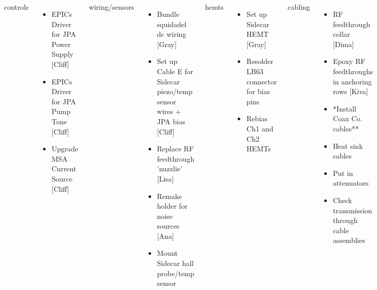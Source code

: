 \documentclass{beamer}
\begin{document}
\begin{frame}
\begin{columns}
{\color{blue} controls}
\begin{itemize}
\item[] {\tiny EPICs Driver for JPA Power Supply  [Cliff]}
\item[] {\tiny EPICs Driver for JPA Pump Tone  [Cliff]}
\item[] {\tiny Upgrade MSA Current Source [Cliff]}
\end{itemize}

{\color{blue} wiring/sensors}
\begin{itemize}
\item[] {\tiny Bundle squidadel dc wiring [Gray]}
\item[] {\tiny Set up Cable E for Sidecar piezo/temp sensor wires + JPA bias [Cliff]}
\item[] {\tiny Replace RF feedthrough 'nuzzlie' [Lisa]}
\item[] {\tiny Remake holder for noise sources  [Ana]}
\item[] {\color{red} \tiny Mount Sidecar hall probe/temp sensor}
\end{itemize}

{\color{blue} hemts}
\begin{itemize}
\item[] {\tiny Set up Sidecar HEMT [Gray]}
\item[]  {\color{red} \tiny  Resolder LB63 connector for bias pins}
\item[]  {\color{red} \tiny  Rebias Ch1 and Ch2 HEMTs}
\end{itemize}



{\color{blue} cabling}
\begin{itemize}
\item[]  {\tiny RF feedthrough collar [Dima]}
\item[] {\tiny  Epoxy RF feedthroughs in anchoring rows [Kiva]}
\item[]  {\color{red} \tiny **Install Coax Co. cables**}
\item[]  {\color{red} \tiny Heat sink cables}
\item[]  {\color{red} \tiny Put in attenuators}
\item[] {\color{red} \tiny Check transmission through cable assemblies}
\end{itemize}


\end{columns}
\end{frame}
\end{document}
